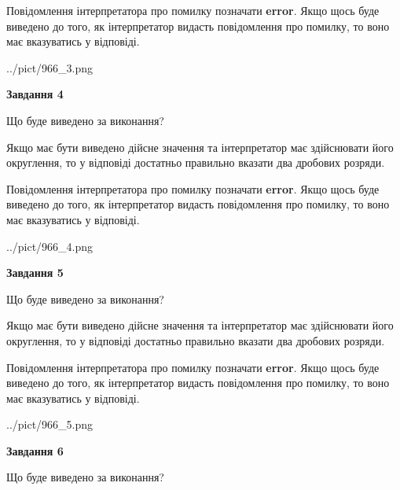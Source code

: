 \documentclass[12pt, ukrainian]{article}
\begin{document}
{\begin {Large}
Повідомлення інтерпретатора про помилку позначати \textbf{error}.
Якщо щось буде виведено до того, як інтерпретатор видасть повідомлення про помилку, 
то воно має вказуватись у відповіді. \par

\begin{center}
	{../pict/966_3.png}
\end{center}
\newpage

{\begin {center}\textbf{Завдання 4}\end {center}}\par
Що буде виведено за виконання? \par

Якщо має бути виведено дійсне значення та інтерпретатор має здійснювати його округлення, 
то у відповіді достатньо правильно вказати два дробових розряди.

Повідомлення інтерпретатора про помилку позначати \textbf{error}.
Якщо щось буде виведено до того, як інтерпретатор видасть повідомлення про помилку, 
то воно має вказуватись у відповіді. \par

\begin{center}
	{../pict/966_4.png}
\end{center}
\newpage

{\begin {center}\textbf{Завдання 5}\end {center}}\par
Що буде виведено за виконання? \par

Якщо має бути виведено дійсне значення та інтерпретатор має здійснювати його округлення, 
то у відповіді достатньо правильно вказати два дробових розряди.

Повідомлення інтерпретатора про помилку позначати \textbf{error}.
Якщо щось буде виведено до того, як інтерпретатор видасть повідомлення про помилку, 
то воно має вказуватись у відповіді. \par

\begin{center}
	{../pict/966_5.png}
\end{center}
\newpage

{\begin {center}\textbf{Завдання 6}\end {center}}\par
Що буде виведено за виконання? \par


\end{Large}}
\end{document}
